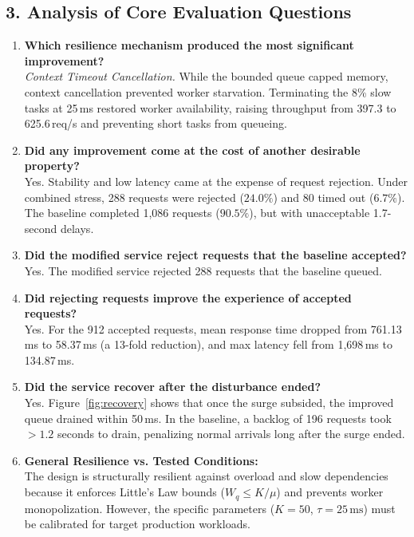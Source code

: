\documentclass[11pt]{article}
\begin{document}
\subsection*{3. Analysis of Core Evaluation Questions}
\begin{enumerate}[label=\textbf{\arabic*.}, leftmargin=1.5em, itemsep=0.3em]
    \item \textbf{Which resilience mechanism produced the most significant improvement?}\\
    \textit{Context Timeout Cancellation.} While the bounded queue capped memory, context cancellation prevented worker starvation. Terminating the 8\% slow tasks at 25\,ms restored worker availability, raising throughput from 397.3 to 625.6\,req/s and preventing short tasks from queueing.
    \item \textbf{Did any improvement come at the cost of another desirable property?}\\
    Yes. Stability and low latency came at the expense of request rejection. Under combined stress, 288 requests were rejected ($24.0\%$) and 80 timed out ($6.7\%$). The baseline completed 1,086 requests ($90.5\%$), but with unacceptable 1.7-second delays.
    \item \textbf{Did the modified service reject requests that the baseline accepted?}\\
    Yes. The modified service rejected 288 requests that the baseline queued.
    \item \textbf{Did rejecting requests improve the experience of accepted requests?}\\
    Yes. For the 912 accepted requests, mean response time dropped from 761.13\,ms to 58.37\,ms (a 13-fold reduction), and max latency fell from 1,698\,ms to 134.87\,ms.
    \item \textbf{Did the service recover after the disturbance ended?}\\
    Yes. Figure~\ref{fig:recovery} shows that once the surge subsided, the improved queue drained within 50\,ms. In the baseline, a backlog of 196 requests took $>1.2$ seconds to drain, penalizing normal arrivals long after the surge ended.
    \item \textbf{General Resilience vs. Tested Conditions:}\\
    The design is structurally resilient against overload and slow dependencies because it enforces Little's Law bounds ($W_q \le K/\mu$) and prevents worker monopolization. However, the specific parameters ($K=50$, $\tau=25\,\text{ms}$) must be calibrated for target production workloads.
\end{enumerate}
\end{document}
